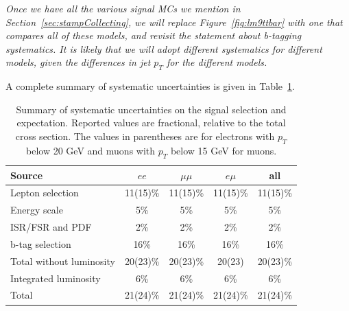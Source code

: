 {\it Once we have all the various signal MCs we mention in Section~\ref{sec:stampCollecting}, we will replace
Figure~\ref{fig:lm9ttbar} with one that compares all of these models, and revisit the statement about
b-tagging systematics. It is likely that we will adopt different systematics for different models, given the
differences in jet $p_T$ for the different models.}

A complete summary of systematic uncertainties is given in Table~\ref{tab:systSumm}.

\begin{table}[h]
\begin{center}
\caption{\small\label{tab:systSumm}Summary of systematic uncertainties on the signal selection and
expectation. Reported values are fractional, relative to the total cross section. The values in parentheses are for electrons 
with $p_T$ below 20 GeV and muons with $p_T$ below 15 GeV for muons.}
\begin{tabular}{lcccc}\hline
Source 					& $ee$		& $\mu\mu$		& $e\mu$	& all \\ \hline
Lepton selection			& 11(15)\%	& 11(15)\%		& 11(15)\%	& 11(15)\% \\
Energy scale				& 5\%		& 5\%			& 5\%		& 5\% \\
ISR/FSR and PDF				& 2\%		& 2\%			& 2\%		& 2\% 	\\
b-tag selection                         & 16\%          & 16\%                  & 16\%          & 16\% \\
Total without luminosity		& 20(23)\%	& 20(23)\%		& 20(23)	& 20(23)\%\\ \hline
Integrated luminosity			& 6\%		& 6\%			& 6\%		& 6\%	\\ \hline
Total 					& 21(24)\% 	& 21(24)\% 		& 21(24)\% 	& 21(24)\% \\
\hline
\end{tabular}
\end{center}
\end{table}
